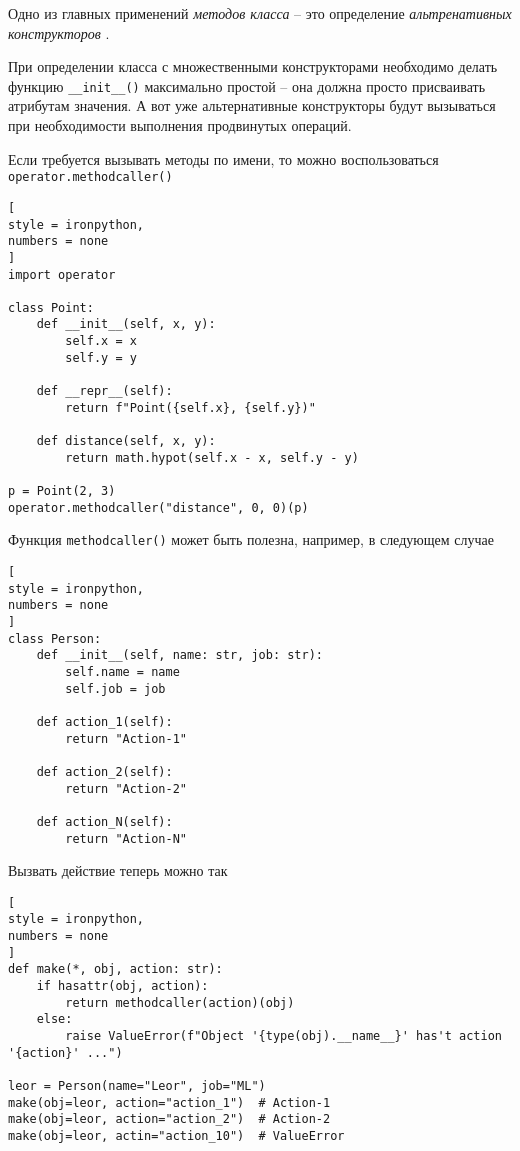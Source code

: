 \documentclass[%
	11pt,
	a4paper,
	utf8,
		]{article}
\begin{document}
Одно из главных применений \emph{методов класса} -- это определение \emph{альтренативных конструкторов} \cite[]{beazley:python_cookbook-2019}. 

При определении класса с множественными конструкторами необходимо делать функцию \verb|__init__()| максимально простой -- она должна просто присваивать атрибутам значения. А вот уже альтернативные конструкторы будут вызываться при необходимости выполнения продвинутых операций.

Если требуется вызывать методы по имени, то можно воспользоваться \texttt{operator.methodcaller()}
\begin{lstlisting}[
style = ironpython,
numbers = none
]
import operator

class Point:
    def __init__(self, x, y):
        self.x = x
        self.y = y
    
    def __repr__(self):
        return f"Point({self.x}, {self.y})"
        
    def distance(self, x, y):
        return math.hypot(self.x - x, self.y - y)

p = Point(2, 3)
operator.methodcaller("distance", 0, 0)(p)
\end{lstlisting}

Функция \texttt{methodcaller()} может быть полезна, например, в следующем случае
\begin{lstlisting}[
style = ironpython,
numbers = none
]
class Person:
    def __init__(self, name: str, job: str):
        self.name = name
        self.job = job
        
    def action_1(self):
        return "Action-1"
        
    def action_2(self):
        return "Action-2"
        
    def action_N(self):
        return "Action-N"
\end{lstlisting}

Вызвать действие теперь можно так
\begin{lstlisting}[
style = ironpython,
numbers = none
]
def make(*, obj, action: str):
    if hasattr(obj, action):
        return methodcaller(action)(obj)
    else:
        raise ValueError(f"Object '{type(obj).__name__}' has't action '{action}' ...")
        
leor = Person(name="Leor", job="ML")   
make(obj=leor, action="action_1")  # Action-1
make(obj=leor, action="action_2")  # Action-2
make(obj=leor, actin="action_10")  # ValueError
\end{lstlisting}
\end{document}
